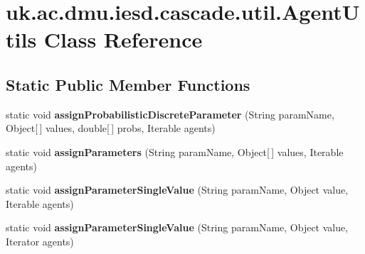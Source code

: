 \hypertarget{classuk_1_1ac_1_1dmu_1_1iesd_1_1cascade_1_1util_1_1_agent_utils}{\section{uk.\-ac.\-dmu.\-iesd.\-cascade.\-util.\-Agent\-Utils Class Reference}
\label{classuk_1_1ac_1_1dmu_1_1iesd_1_1cascade_1_1util_1_1_agent_utils}
}
\subsection*{Static Public Member Functions}
\begin{DoxyCompactItemize}
\item 
\hypertarget{classuk_1_1ac_1_1dmu_1_1iesd_1_1cascade_1_1util_1_1_agent_utils_a57fc90d800bd9e10956f9126775db920}{static void {\bfseries assign\-Probabilistic\-Discrete\-Parameter} (String param\-Name, Object\mbox{[}$\,$\mbox{]} values, double\mbox{[}$\,$\mbox{]} probs, Iterable agents)}\label{classuk_1_1ac_1_1dmu_1_1iesd_1_1cascade_1_1util_1_1_agent_utils_a57fc90d800bd9e10956f9126775db920}

\item 
\hypertarget{classuk_1_1ac_1_1dmu_1_1iesd_1_1cascade_1_1util_1_1_agent_utils_a42a61a1804be17715fe989c14b544510}{static void {\bfseries assign\-Parameters} (String param\-Name, Object\mbox{[}$\,$\mbox{]} values, Iterable agents)}\label{classuk_1_1ac_1_1dmu_1_1iesd_1_1cascade_1_1util_1_1_agent_utils_a42a61a1804be17715fe989c14b544510}

\item 
\hypertarget{classuk_1_1ac_1_1dmu_1_1iesd_1_1cascade_1_1util_1_1_agent_utils_ac11fa11d7ab8f8de40cbb715938218d3}{static void {\bfseries assign\-Parameter\-Single\-Value} (String param\-Name, Object value, Iterable agents)}\label{classuk_1_1ac_1_1dmu_1_1iesd_1_1cascade_1_1util_1_1_agent_utils_ac11fa11d7ab8f8de40cbb715938218d3}

\item 
\hypertarget{classuk_1_1ac_1_1dmu_1_1iesd_1_1cascade_1_1util_1_1_agent_utils_ab86096a4a200041303df1cd7e31e7a21}{static void {\bfseries assign\-Parameter\-Single\-Value} (String param\-Name, Object value, Iterator agents)}\label{classuk_1_1ac_1_1dmu_1_1iesd_1_1cascade_1_1util_1_1_agent_utils_ab86096a4a200041303df1cd7e31e7a21}

\end{DoxyCompactItemize}


